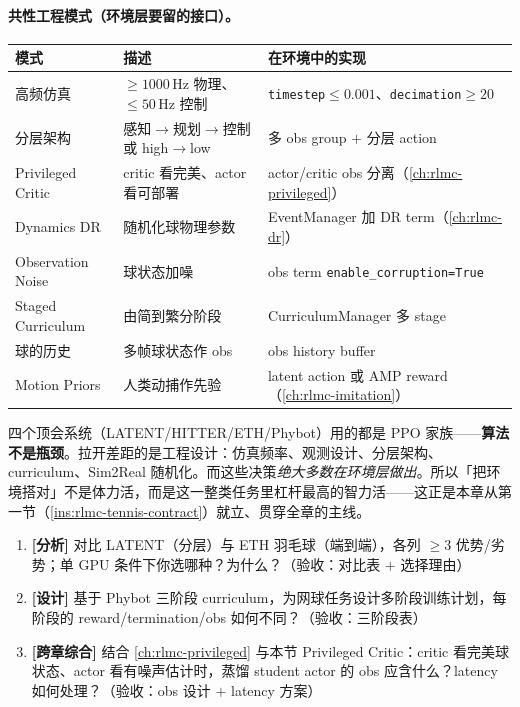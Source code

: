\paragraph{共性工程模式（环境层要留的接口）。}

\begin{center}
\small
\begin{tabular}{@{}llp{4.6cm}@{}}
\toprule
模式 & 描述 & 在环境中的实现 \\
\midrule
高频仿真 & $\ge1000$\,Hz 物理、$\le50$\,Hz 控制 & \verb|timestep|$\le0.001$、\verb|decimation|$\ge20$ \\
分层架构 & 感知$\to$规划$\to$控制 或 high$\to$low & 多 obs group $+$ 分层 action \\
Privileged Critic & critic 看完美、actor 看可部署 & actor/critic obs 分离（\cref{ch:rlmc-privileged}） \\
Dynamics DR & 随机化球物理参数 & EventManager 加 DR term（\cref{ch:rlmc-dr}） \\
Observation Noise & 球状态加噪 & obs term \verb|enable_corruption=True| \\
Staged Curriculum & 由简到繁分阶段 & CurriculumManager 多 stage \\
球的历史 & 多帧球状态作 obs & obs history buffer \\
Motion Priors & 人类动捕作先验 & latent action 或 AMP reward（\cref{ch:rlmc-imitation}） \\
\bottomrule
\end{tabular}
\end{center}

\begin{insight}\label{ins:rlmc-tennis-engineering}
四个顶会系统（LATENT/HITTER/ETH/Phybot）用的都是 PPO 家族——\textbf{算法不是瓶颈}。拉开差距的是工程设计：仿真频率、观测设计、分层架构、curriculum、Sim2Real 随机化。而这些决策\emph{绝大多数在环境层做出}。所以「把环境搭对」不是体力活，而是这一整类任务里杠杆最高的智力活——这正是本章从第一节（\cref{ins:rlmc-tennis-contract}）就立、贯穿全章的主线。
\end{insight}

\begin{practice}[本节动手任务]
\begin{enumerate}
  \item \textbf{[分析]} 对比 LATENT（分层）与 ETH 羽毛球（端到端），各列 $\ge3$ 优势/劣势；单 GPU 条件下你选哪种？为什么？（验收：对比表 $+$ 选择理由）
  \item \textbf{[设计]} 基于 Phybot 三阶段 curriculum，为网球任务设计多阶段训练计划，每阶段的 reward/termination/obs 如何不同？（验收：三阶段表）
  \item \textbf{[跨章综合]} 结合 \cref{ch:rlmc-privileged} 与本节 Privileged Critic：critic 看完美球状态、actor 看有噪声估计时，蒸馏 student actor 的 obs 应含什么？latency 如何处理？（验收：obs 设计 $+$ latency 方案）
\end{enumerate}
\end{practice}

